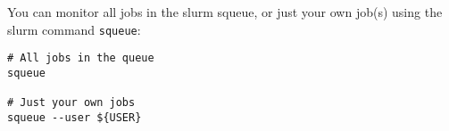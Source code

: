 \begin{note}

You can monitor all jobs in the slurm squeue, or just your own job(s) using the slurm command \texttt{squeue}:

\begin{lstlisting}
# All jobs in the queue
squeue

# Just your own jobs
squeue --user ${USER}
\end{lstlisting}

%
%

\end{note}
